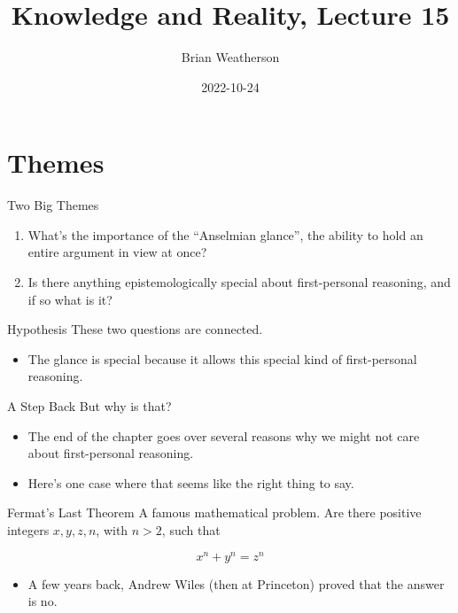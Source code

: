\documentclass[
  17pt,
  letterpaper,
  ignorenonframetext,
  aspectratio=169,
]{beamer}
\title{Knowledge and Reality, Lecture 15}
\author{Brian Weatherson}
\date{2022-10-24}
\providecommand{\tightlist}{%
  \setlength{\itemsep}{0pt}\setlength{\parskip}{0pt}}\usepackage{longtable,booktabs,array}
\begin{document}
\frame{\titlepage}
\ifdefined\Shaded\renewenvironment{Shaded}{\begin{tcolorbox}[breakable, interior hidden, borderline west={3pt}{0pt}{shadecolor}, boxrule=0pt, sharp corners, frame hidden, enhanced]}{\end{tcolorbox}}\fi

\hypertarget{themes}{%
\section{Themes}\label{themes}}

\begin{frame}{Two Big Themes}
\protect\hypertarget{two-big-themes}{}
\begin{enumerate}[<+->]
\tightlist
\item
  What's the importance of the ``Anselmian glance'', the ability to hold
  an entire argument in view at once?
\item
  Is there anything epistemologically special about first-personal
  reasoning, and if so what is it?
\end{enumerate}
\end{frame}

\begin{frame}{Hypothesis}
\protect\hypertarget{hypothesis}{}
These two questions are connected.

\begin{itemize}[<+->]
\tightlist
\item
  The glance is special because it allows this special kind of
  first-personal reasoning.
\end{itemize}
\end{frame}

\begin{frame}{A Step Back}
\protect\hypertarget{a-step-back}{}
But why is that?

\begin{itemize}[<+->]
\tightlist
\item
  The end of the chapter goes over several reasons why we might not care
  about first-personal reasoning.
\item
  Here's one case where that seems like the right thing to say.
\end{itemize}
\end{frame}

\begin{frame}{Fermat's Last Theorem}
\protect\hypertarget{fermats-last-theorem}{}
A famous mathematical problem. Are there positive integers
\(x, y, z, n\), with \(n > 2\), such that

\[
x^n + y^n = z^n
\]

\begin{itemize}[<+->]
\tightlist
\item
  A few years back, Andrew Wiles (then at Princeton) proved that the
  answer is no.
\end{itemize}
\end{frame}
\end{document}
